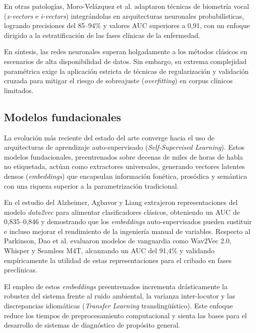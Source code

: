 En otras patologías, Moro-Velázquez et al. \cite{moro2020, moro2021new} adaptaron técnicas de biometría vocal (\textit{x-vectors} e \textit{i-vectors}) integrándolas en arquitecturas neuronales probabilísticas, logrando precisiones del 85--94\% y valores AUC superiores a 0,91, con un enfoque dirigido a la estratificación de las fases clínicas de la enfermedad.

En síntesis, las redes neuronales superan holgadamente a los métodos clásicos en escenarios de alta disponibilidad de datos. Sin embargo, su extrema complejidad paramétrica exige la aplicación estricta de técnicas de regularización y validación cruzada para mitigar el riesgo de sobreajuste (\textit{overfitting}) en corpus clínicos limitados.

\subsection{Modelos fundacionales}

La evolución más reciente del estado del arte converge hacia el uso de arquitecturas de aprendizaje auto-supervisado (\textit{Self-Supervised Learning}). Estos modelos fundacionales, preentrenados sobre decenas de miles de horas de habla no etiquetada, actúan como extractores universales, generando vectores latentes densos (\textit{embeddings}) que encapsulan información fonética, prosódica y semántica con una riqueza superior a la parametrización tradicional.

En el estudio del Alzheimer, Agbavor y Liang \cite{agbavor2022} extrajeron representaciones del modelo \textit{data2vec} para alimentar clasificadores clásicos, obteniendo un AUC de 0,835--0,846 y demostrando que los \textit{embeddings} auto-supervisados pueden sustituir e incluso mejorar el rendimiento de la ingeniería manual de variables. Respecto al Parkinson, Dao et al. \cite{dao2025} evaluaron modelos de vanguardia como Wav2Vec 2.0, Whisper y Seamless M4T, alcanzando un AUC del 91,4\% y validando empíricamente la utilidad de estas representaciones para el cribado en fases preclínicas.

El empleo de estos \textit{embeddings} preentrenados incrementa drásticamente la robustez del sistema frente al ruido ambiental, la varianza inter-locutor y las discrepancias idiomáticas (\textit{Transfer Learning} translingüístico). Este enfoque reduce los tiempos de preprocesamiento computacional y sienta las bases para el desarrollo de sistemas de diagnóstico de propósito general.

